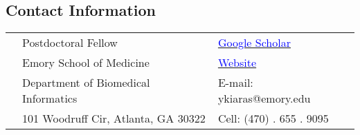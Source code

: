 \documentclass[margin, line]{res}
\begin{document}

\vspace*{-.35in} \name{  \hspace{0cm}{\LARGE Yashar Kiarashi} \vspace*{0.1in}}

\begin{resume}
\thispagestyle{plain} %
\section{\sc \textbf{\large{Contact Information}}}
\vspace{.05in}
\begin{tabular}{@{}p{0.20in}p{3in}p{2.75in}}
 & Postdoctoral Fellow & \href{https://scholar.google.com/citations?user=1WWKzTEAAAAJ} {\textcolor{blue}{Google Scholar}} \\
&Emory School of Medicine & \href{https://yashkia.github.io}{\textcolor{blue}{Website}} \\
 & Department of Biomedical Informatics & E-mail: {ykiaras@emory.edu} \\
 &101 Woodruff Cir, Atlanta, GA 30322& Cell: (470) . 655 . 9095\\


 
\end{tabular}





\end{resume}
\end{document}
